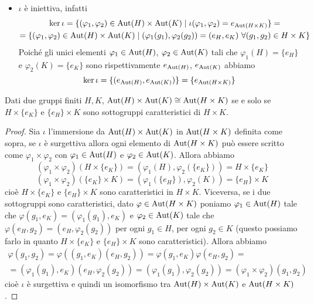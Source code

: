 \documentclass[11pt]{scrartcl}
\begin{document}
\begin{itemize}
    \item$\iota$ è iniettiva, infatti \begin{multline*}
        \ker \iota = \{(\varphi_1, \varphi_2) \in \operatorname{Aut}(H)\times \operatorname{Aut}(K) \mid
        \iota(\varphi_1, \varphi_2) = e_{\operatorname{Aut}(H\times K)}\} = \\
        = \{(\varphi_1, \varphi_2) \in \operatorname{Aut}(H)\times \operatorname{Aut}(K)\mid 
        (\varphi_1(g_1), \varphi_2(g_2)) = (e_H, e_K)~\forall 
        (g_1, g_2) \in H\times K\}
    \end{multline*} Poiché gli unici elementi $\varphi_1 \in \operatorname{Aut}(H)$,
    $\varphi_2 \in \operatorname{Aut}(K)$ tali che $\varphi_1(H) = \{e_H\}$ e $\varphi_2(K) = \{e_K\}$
    sono rispettivamente $e_{\operatorname{Aut}(H)}$, $e_{\operatorname{Aut}(K)}$ abbiamo \[
        \ker\iota = \{(e_{\operatorname{Aut}(H)}, e_{\operatorname{Aut}(K)})\} = \{e_{\operatorname{Aut}(H \times K)}\}
    \] 

\end{itemize}

\begin{proposition}
    Dati due gruppi finiti $H, K$, $\operatorname{Aut}(H)\times \operatorname{Aut}(K)\cong \operatorname{Aut}(H\times K)$
    se e solo se $H\times \{e_K\}$ e $\{e_H\}\times K$ sono sottogruppi 
    caratteristici di $H\times K$.
\end{proposition}

\begin{proof}
    Sia $\iota$ l'immersione da $\operatorname{Aut}(H)\times \operatorname{Aut}(K)$ in $\operatorname{Aut}(H\times K)$ 
    definita come sopra, se $\iota$ è surgettiva allora ogni elemento di 
    $\operatorname{Aut}(H\times K)$ può essere scritto come $\varphi_1\times\varphi_2$ con
    $\varphi_1 \in \operatorname{Aut}(H)$ e $\varphi_2 \in \operatorname{Aut}(K)$. Allora abbiamo 
    \[
        (\varphi_1\times\varphi_2)(H\times\{e_K\}) = 
        (\varphi_1(H), \varphi_2(\{e_K\})) = H\times\{e_K\}
    \]
    \[
        (\varphi_1\times \varphi_2)(\{e_K\}\times K) = 
        (\varphi_1(\{e_H\}), \varphi_2(K)) = \{e_H\}\times K
    \]cioè $H\times\{e_K\}$ e $\{e_H\}\times K$ sono caratteristici in
    $H\times K$. Viceversa, se i due sottogruppi sono caratteristici, dato
    $\varphi \in \operatorname{Aut}(H\times K)$ poniamo $\varphi_1 \in \operatorname{Aut}(H)$ tale che 
    $\varphi(g_1, e_K) = (\varphi_1(g_1), e_K)$ e $\varphi_2 \in \operatorname{Aut}(K)$ 
    tale che $\varphi(e_H, g_2) = (e_H, \varphi_2(g_2))$ per ogni $g_1 \in H$,
    per ogni $g_2 \in K$ (questo possiamo farlo in quanto $H\times\{e_K\}$ 
    e $\{e_H\}\times K$ sono caratteristici). Allora abbiamo 
    \begin{multline*}
        \varphi(g_1, g_2) = \varphi((g_1, e_K)(e_H, g_2)) = 
        \varphi(g_1, e_K)\varphi(e_H, g_2) = \\
        = (\varphi_1(g_1), e_K)(e_H, \varphi_2(g_2)) = 
        (\varphi_1(g_1), \varphi_2(g_2)) = (\varphi_1\times\varphi_2)(g_1, g_2)
    \end{multline*}cioè $\iota$ è surgettiva e quindi un isomorfismo tra
    $\operatorname{Aut}(H)\times \operatorname{Aut}(K)$ e $\operatorname{Aut}(H\times K)$.
\end{proof}
\end{document}
